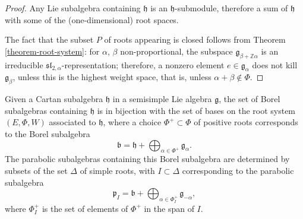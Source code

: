 \begin{proof}
Any Lie subalgebra containing $\mathfrak h$ is an $\mathfrak h$-submodule, therefore a sum of $\mathfrak h$ with some of the (one-dimensional) root spaces.

The fact that the subset $P$ of roots appearing is closed follows from Theorem \ref{theorem-root-system}: for $\alpha$, $\beta$ non-proportional, the subspace $\mathfrak g_{\beta+\mathbb Z\alpha}$ is an irreducible $\mathfrak{sl}_{2,\alpha}$-representation; therefore, a nonzero element $e\in \mathfrak g_\alpha$ does not kill $\mathfrak g_\beta$, unless this is the highest weight space, that is, unless $\alpha+\beta\notin \Phi$. 
\end{proof}


\begin{proposition}
\label{proposition-roots-parabolics}
 Given a Cartan subalgebra $\mathfrak h$ in a semisimple Lie algebra $\mathfrak g$, the set of Borel subalgebras containing $\mathfrak h$ is in bijection with the set of bases on the root system $(E, \Phi,W)$ associated to $\mathfrak h$, where a choice $\Phi^+\subset \Phi$ of positive roots corresponds to the Borel subalgebra
 $$ \mathfrak b = \mathfrak h + \bigoplus_{\alpha\in\Phi^+} \mathfrak g_\alpha.$$
 The parabolic subalgebras containing this Borel subalgebra are determined by subsets of the set $\Delta$ of simple roots, with $I\subset\Delta$ corresponding to the parabolic subalgebra
 $$ \mathfrak p_I = \mathfrak b + \bigoplus_{\alpha\in \Phi_I^+} \mathfrak g_{-\alpha},$$
 where $\Phi_I^+$ is the set of elements of $\Phi^+$ in the span of $I$.
\end{proposition}

